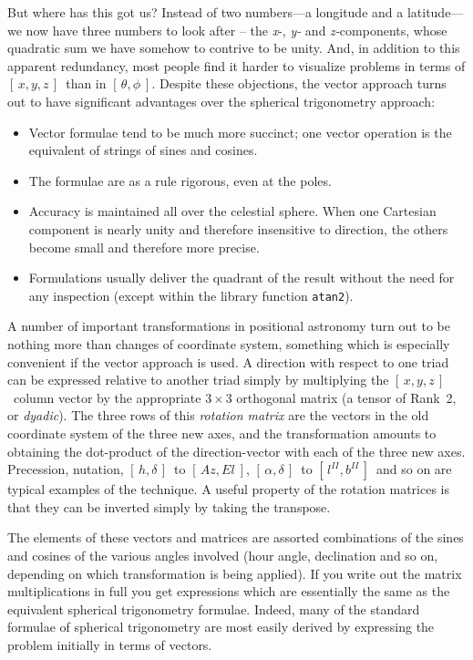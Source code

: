 \documentclass[11pt,fleqn,twoside]{article}
\renewcommand{\_}{{\tt\char'137}}     %
\newcommand{\radec}     {$[\,\alpha,\delta\,]$}
\newcommand{\hadec}     {$[\,h,\delta\,]$}
\newcommand{\azel}      {$[\,Az,El~]$}
\newcommand{\gal}       {$[\,l^{I\!I},b^{I\!I}\,]$}
\newcommand{\xyz}       {$[\,x,y,z\,]$}
\begin{document}
But where has this got us?  Instead of two numbers---a longitude and
a latitude---we now have three numbers to look after
-- the {\it x}-, {\it y-} and
{\it z-}components, whose quadratic sum we have somehow to contrive to
be unity.  And, in addition to this apparent redundancy,
most people find it harder to visualize
problems in terms of \xyz\ than in $[\,\theta,\phi~]$.
Despite these objections, the vector approach turns out to have
significant advantages over the spherical trigonometry approach:
\begin{itemize}
\item Vector formulae tend to be much more succinct;  one vector
      operation is the equivalent of strings of sines and cosines.
\item The formulae are as a rule rigorous, even at the poles.
\item Accuracy is maintained all over the celestial sphere.
      When one Cartesian component is nearly unity and
      therefore insensitive to direction, the others become small
      and therefore more precise.
\item Formulations usually deliver the quadrant of the result
      without the need for any inspection (except within the
      library function {\tt atan2}).
\end{itemize}
A number of important transformations in positional
astronomy turn out to be nothing more than changes of coordinate
system, something which is especially convenient if
the vector approach is used.  A direction with respect
to one triad can be expressed relative to another triad simply
by multiplying the \xyz\ column vector by the appropriate
$3\times3$ orthogonal matrix
(a tensor of Rank~2, or {\it dyadic}).  The three rows of this
{\it rotation matrix}\/
are the vectors in the old coordinate system of the three
new axes, and the transformation amounts to obtaining the
dot-product of the direction-vector with each of the three
new axes.  Precession, nutation, \hadec\ to \azel,
\radec\ to \gal\ and so on are typical examples of the
technique.  A useful property of the rotation matrices
is that they can be inverted simply by taking the transpose.
 
The elements of these vectors and matrices are assorted combinations of
the sines and cosines of the various angles involved (hour angle,
declination and so on, depending on which transformation is
being applied).  If you write out the matrix multiplications
in full you get expressions which are essentially the same as the
equivalent spherical trigonometry formulae.  Indeed, many of the
standard formulae of spherical trigonometry are most easily
derived by expressing the problem initially in
terms of vectors.
\end{document}
